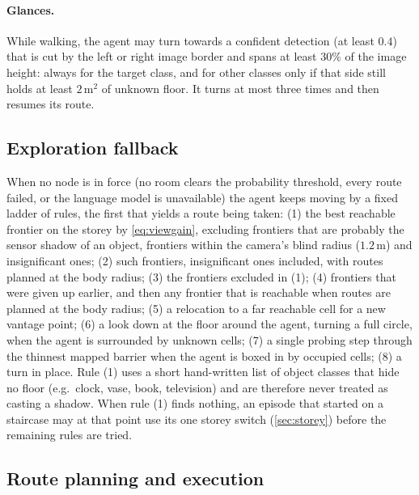 \documentclass[10pt]{article}
\newcommand{\m}{\,\mathrm{m}}
\newcommand{\sqm}{\,\mathrm{m}^2}
\begin{document}
\paragraph{Glances.} While walking, the agent may turn towards a confident
detection (at least $0.4$) that is cut by the left or right image border and
spans at least $30\%$ of the image height: always for the target class, and
for other classes only if that side still holds at least $2\sqm$ of unknown
floor. It turns at most
three times and then resumes its route.

\subsection{Exploration fallback}\label{sec:fallback}
When no node is in force (no room clears the probability threshold, every route
failed, or the language model is unavailable) the agent keeps moving by a fixed
ladder of rules, the first that yields a route being taken:
(1) the best reachable frontier on the storey by \cref{eq:viewgain}, excluding
frontiers that are probably the sensor shadow of an object, frontiers within
the camera's blind radius ($1.2\m$) and insignificant ones;
(2) such frontiers, insignificant ones included, with routes planned at the
body radius;
(3) the frontiers excluded in (1);
(4) frontiers that were given up earlier, and then any frontier that is
reachable when routes are planned at the body radius;
(5) a relocation to a far reachable cell for a new vantage point;
(6) a look down at the floor around the agent, turning a full circle, when the
agent is surrounded by unknown cells;
(7) a single probing step through the thinnest mapped barrier when the agent is
boxed in by occupied cells;
(8) a turn in place.
Rule (1) uses a short hand-written list of object classes that hide no floor
(e.g.\ clock, vase, book, television) and are therefore never treated as
casting a shadow. When rule (1) finds nothing, an episode that started on a
staircase may at that point use its one storey switch (\cref{sec:storey})
before the remaining rules are tried.

\subsection{Route planning and execution}\label{sec:navigation}
\end{document}
